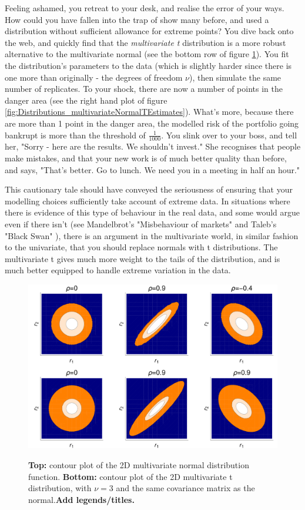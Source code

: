 \documentclass[11pt,fullpage]{book}
\begin{document}
Feeling ashamed, you retreat to your desk, and realise the error of your ways. How could you have fallen into the trap of show many before, and used a distribution without sufficient allowance for extreme points? You dive back onto the web, and quickly find that the \textit{multivariate t} distribution is a more robust alternative to the multivariate normal (see the bottom row of figure \ref{fig:Distributions_multivariateNormalT}). You fit the distribution's parameters to the data (which is slightly harder since there is one more than originally - the degrees of freedom $\nu$), then simulate the same number of replicates. To your shock, there are now a number of points in the danger area (see the right hand plot of figure \ref{fig:Distributions_multivariateNormalTEstimates}). What's more, because there are more than 1 point in the danger area, the modelled risk of the portfolio going bankrupt is more than the threshold of $\frac{1}{1000}$. You slink over to your boss, and tell her, "Sorry - here are the results. We shouldn't invest." She recognises that people make mistakes, and that your new work is of much better quality than before, and says, "That's better. Go to lunch. We need you in a meeting in half an hour."

This cautionary tale should have conveyed the seriousness of ensuring that your modelling choices sufficiently take account of extreme data. In situations where there is evidence of this type of behaviour in the real data, and some would argue even if there isn't (see Mandelbrot's "Misbehaviour of markets" \cite{mandelbrot2008misbehaviour} and Taleb's "Black Swan" \cite{taleb2010black}), there is an argument in the multivariate world, in similar fashion to the univariate, that you should replace normals with t distributions. The multivariate t gives much more weight to the tails of the distribution, and is much better equipped to handle extreme variation in the data.

\begin{figure}
\centering
\scalebox{0.3} 
{\includegraphics{Distributions_multivariateNormalT.pdf}}
\caption{\textbf{Top:} contour plot of the 2D multivariate normal distribution function. \textbf{Bottom:} contour plot of the 2D multivariate t distribution, with $\nu=3$ and the same covariance matrix as the normal.\textbf{Add legends/titles.}}\label{fig:Distributions_multivariateNormalT}
\end{figure}
\end{document}
